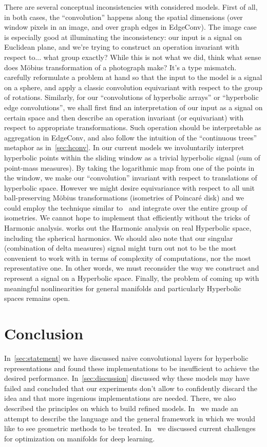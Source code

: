 There are several conceptual inconsistencies with considered models.  First
of all, in both cases, the ``convolution'' happens along the spatial dimensions
(over window pixels in an image, and over graph edges in EdgeConv). The image
case is especially good at illuminating the inconsistency: our input is a
signal on Euclidean plane, and we're trying to construct an operation invariant
with respect to... what group exactly? While this is not what we did, think
what sense does M\"obius transformation of a photograph make? It's a type
mismatch.
\citet{s2cnn} carefully reformulate a problem at hand so that the input to the
model is a signal on a sphere, and apply a classic convolution equivariant with
respect to the group of rotations. Similarly, for our ``convolutions of
hyperbolic arrays'' or ``hyperbolic edge convolutions'', we shall first find an
interpretation of our input as a signal on certain space and then describe an
operation invariant (or equivariant) with respect to appropriate
transformations. Such operation should be interpretable as aggregation in EdgeConv,
and also follow the intuition of the ``continuous trees'' metaphor as
in~\autoref{sec:hconv}. In our current models we involuntarily interpret
hyperbolic points within the sliding window as a trivial hyperbolic signal (sum
of point-mass measures). By taking the logarithmic map from one of the points in the
window, we make our ``convolution'' invariant with respect to translations of
hyperbolic space. However we might desire equivariance with respect to
all unit ball-preserving M\"obius transformations (isometries of Poincar\'e disk)
and we could employ the technique similar to~\cite{s2cnn} and integrate
over the entire group of isometries. We cannot hope to implement that efficiently
without the tricks of Harmonic analysis. \citet{stollharmonic} works out the
Harmonic analysis on real Hyperbolic space, including the spherical harmonics.
We should also note that our singular (combination of delta measures)
signal might turn out not to be the most convenient to work with in terms of
complexity of computations, nor the most representative one. In other words, we
must reconsider the way we construct and represent a signal on a Hyperbolic
space. Finally, the problem of coming up with meaningful nonlinearities
for general manifolds and particularly Hyperbolic spaces remains open.

\section{Conclusion}

In~\autoref{sec:statement} we have discussed naive convolutional layers for
hyperbolic representations and found these implementations to be insufficient
to achieve the desired performance. In~\autoref{sec:discussion} discussed why
these models may have failed and concluded that our experiments don't allow to
confidently discard the idea and that more ingenious implementations are
needed.  There, we also described the principles on which to build refined
models.  In~ we made an attempt to describe the
language and the general framework in which we would like to see geometric
methods to be treated.  In~ we discussed current challenges
for optimization on manifolds for deep learning.
